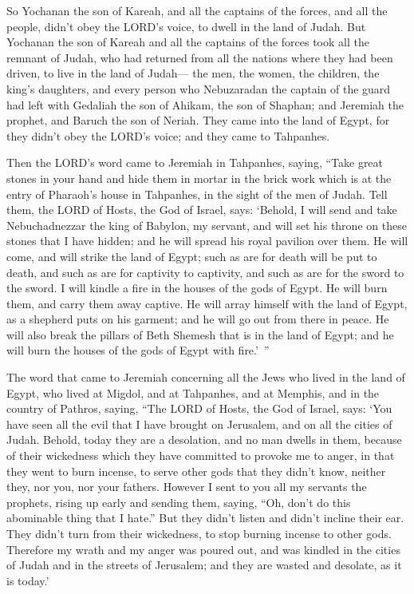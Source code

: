 \myverse{}So Yochanan the son of Kareah, and all the captains of the forces, and all the people, didn’t obey the LORD’s voice, to dwell in the land of Judah. \myverse{}But Yochanan the son of Kareah and all the captains of the forces took all the remnant of Judah, who had returned from all the nations where they had been driven, to live in the land of Judah— \myverse{}the men, the women, the children, the king’s daughters, and every person who Nebuzaradan the captain of the guard had left with Gedaliah the son of Ahikam, the son of Shaphan; and Jeremiah the prophet, and Baruch the son of Neriah. \myverse{}They came into the land of Egypt, for they didn’t obey the LORD’s voice; and they came to Tahpanhes.


\myverse{}Then the LORD’s word came to Jeremiah in Tahpanhes, saying, \myverse{}“Take great stones in your hand and hide them in mortar in the brick work which is at the entry of Pharaoh’s house in Tahpanhes, in the sight of the men of Judah. \myverse{}Tell them, the LORD of Hosts, the God of Israel, says: ‘Behold, I will send and take Nebuchadnezzar the king of Babylon, my servant, and will set his throne on these stones that I have hidden; and he will spread his royal pavilion over them. \myverse{}He will come, and will strike the land of Egypt; such as are for death will be put to death, and such as are for captivity to captivity, and such as are for the sword to the sword. \myverse{}I will kindle a fire in the houses of the gods of Egypt. He will burn them, and carry them away captive. He will array himself with the land of Egypt, as a shepherd puts on his garment; and he will go out from there in peace. \myverse{}He will also break the pillars of Beth Shemesh that is in the land of Egypt; and he will burn the houses of the gods of Egypt with fire.’ ”


\mychapter{} \myverse*{}The word that came to Jeremiah concerning all the Jews who lived in the land of Egypt, who lived at Migdol, and at Tahpanhes, and at Memphis, and in the country of Pathros, saying, \myverse{}“The LORD of Hosts, the God of Israel, says: ‘You have seen all the evil that I have brought on Jerusalem, and on all the cities of Judah. Behold, today they are a desolation, and no man dwells in them, \myverse{}because of their wickedness which they have committed to provoke me to anger, in that they went to burn incense, to serve other gods that they didn’t know, neither they, nor you, nor your fathers. \myverse{}However I sent to you all my servants the prophets, rising up early and sending them, saying, “Oh, don’t do this abominable thing that I hate.” \myverse{}But they didn’t listen and didn’t incline their ear. They didn’t turn from their wickedness, to stop burning incense to other gods. \myverse{}Therefore my wrath and my anger was poured out, and was kindled in the cities of Judah and in the streets of Jerusalem; and they are wasted and desolate, as it is today.’ 


